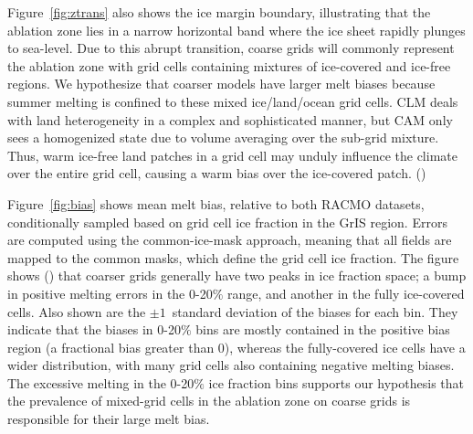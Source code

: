 \documentclass[draft]{agujournal2019}
\begin{document}
Figure~\ref{fig:ztrans} also shows the ice margin boundary, illustrating that the ablation zone lies in a narrow horizontal band where the ice sheet rapidly plunges to sea-level. Due to this abrupt transition, coarse grids will commonly represent the ablation zone with grid cells containing mixtures of ice-covered and ice-free regions. We hypothesize that coarser models have larger melt biases
because summer melting is confined to these mixed ice/land/ocean grid cells. CLM deals with land heterogeneity in a complex and sophisticated manner, but CAM only sees a homogenized state due to volume averaging over the sub-grid mixture. Thus, warm ice-free land patches in a grid cell may unduly influence the climate over the entire grid cell, causing a warm bias over the ice-covered patch. ({\color{blue}{This is an interesting conclusion pointing to the need for better treatment of surface inhomogeneity in CAM.  This might be a way to compensate for coarse resolution in future CESM versions?}})

Figure~\ref{fig:bias} shows mean melt bias, relative to both RACMO datasets, conditionally sampled based on grid cell ice fraction in the GrIS region. Errors are computed using the common-ice-mask approach, meaning that all fields are mapped to the common masks, which define the grid cell ice fraction. The figure shows ({\color{blue}{Any idea why the errors are smaller in the cells with intermediate ice fraction?  I wouldn't have expected this.}}) that coarser grids generally have two peaks in ice fraction space; a bump in positive melting errors in the 0-20$\%$ range, and another in the fully ice-covered cells. Also shown are the $\pm 1$~standard deviation of the biases for each bin. They indicate that the biases in 0-20$\%$ bins are mostly contained in the positive bias region (a fractional bias greater than 0), whereas the fully-covered ice cells have a wider distribution, with many grid cells also containing negative melting biases. The excessive melting in the 0-20$\%$ ice fraction bins supports our hypothesis that the prevalence of mixed-grid cells in the ablation zone on coarse grids is responsible for their large melt bias.

{\color{green}{Rene - is the melt map consistent with the bin figure? Smallest errors are interior points which correspond to glacier fraction bin of 1, which the largest errors.}}
{\color{blue}{ARH - I can check. The bin figure is fractional change so its a different metric, which could explain the apparent inconsistency.}}
\end{document}
